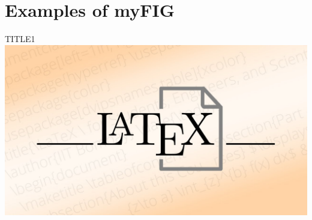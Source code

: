 \documentclass[12pt,a4paper]{article}
\let\oldlistofmyFIG\listofmyFIG
\renewcommand\listofmyFIG
{
	\pagestyle{empty} %
	\oldlistofmyFIG %
	\clearpage %
	\pagestyle{plain} %
}
\begin{document}
%
%


%
%

\listofmyFIG
\newpage



%
%

\section{Examples of myFIG}

\lipsum[4]

\qquad
\begin{myFIGlst}{TITLE1}{}
\includegraphics[scale=0.15]{LaTeX.jpg}
\end{myFIGlst}
\end{document}
